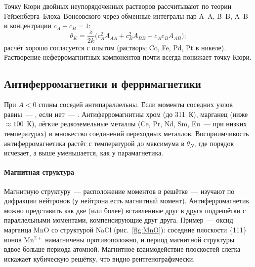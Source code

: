Точку Кюри двойных неупорядоченных растворов рассчитывают по теории
Гейзенберга--Блоха--Вонсовского через обменные интегралы пар A--A, B--B,
A--B и концентрации $c_A+c_B=1$:
\begin{equation}\label{eq:curie-alloy}
\theta_K=\frac z{2k}\bigl(c_A^2A_{AA}+c_B^2A_{BB}+c_Ac_BA_{AB}\bigr);
\end{equation}
расчёт хорошо согласуется с опытом (растворы Co, Fe, Pd, Pt в никеле).
Растворение неферромагнитных компонентов почти всегда понижает точку
Кюри.

\subsection{Антиферромагнетики и ферримагнетики}\label{ssec:antiferro}

При $A<0$ спины соседей антипараллельны. Если моменты соседних узлов
равны~— , если нет~— .
Антиферромагнитны хром (до 311~К), марганец (ниже $\approx100$~К),
лёгкие редкоземельные металлы (Ce, Pr, Nd, Sm, Eu~— при низких
температурах) и
множество соединений переходных металлов. Восприимчивость
антиферромагнетика растёт с температурой до максимума в  $\theta_N$, где порядок исчезает, а выше уменьшается, как у
парамагнетика.

\paragraph{Магнитная структура}
Магнитную структуру~— расположение моментов в решётке~— изучают по
дифракции нейтронов (у нейтрона есть магнитный момент). Антиферромагнетик
можно представить как две (или более) вставленные друг в друга
подрешётки с параллельными моментами, компенсирующие друг друга. Пример~—
оксид марганца MnO со структурой NaCl (рис.~\ref{fig:MnO}): соседние
плоскости \{111\} ионов Mn$^{2+}$ намагничены противоположно, и период
магнитной структуры вдвое больше периода атомной. Магнитное
взаимодействие плоскостей слегка искажает кубическую решётку, что видно
рентгенографически.

